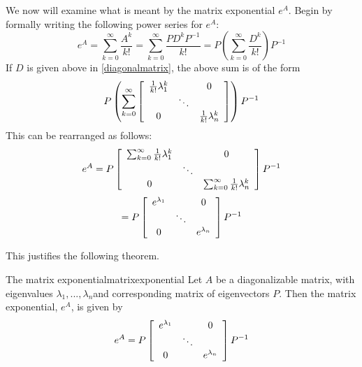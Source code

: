We now will examine what is meant by the matrix exponential $e^{A}$. Begin by formally writing the following power series for $e^{A}$:
\begin{equation*}
e^{A} =  \sum_{k=0}^{\infty }\frac{A^{k}}{k!}=\sum_{k=0}^{\infty }\frac{PD^{k}P^{-1}}{k!}=P \left( \sum_{k=0}^{\infty }\frac{D^{k}}{k!} \right)P^{-1}
\end{equation*}
If $D$ is given above in \ref{diagonalmatrix}, the above sum is of the form 
\begin{equation*}
P \left( \sum_{k=0}^{\infty }\left[ 
\begin{array}{ccc}
\frac{1}{k!}\lambda _{1}^{k} &  & 0 \\ 
& \ddots &  \\ 
0 &  & \frac{1}{k!}\lambda _{n}^{k}
\end{array}
\right] \right) P^{-1}
\end{equation*}
This can be rearranged as follows:
\begin{equation*}
e^{A}=P\left[ 
\begin{array}{ccc}
\sum_{k=0}^{\infty }\frac{1}{k!}\lambda _{1}^{k} &  & 0 \\ 
& \ddots &  \\ 
0 &  & \sum_{k=0}^{\infty }\frac{1}{k!}\lambda _{n}^{k}
\end{array}
\right] P^{-1}
\end{equation*}
\begin{equation*}
=P\left[ 
\begin{array}{ccc}
e^{\lambda _{1}} &  & 0 \\ 
& \ddots &  \\ 
0 &  & e^{\lambda _{n}}
\end{array}
\right] P^{-1}
\end{equation*}

This justifies the following theorem. 

\begin{theorem}{The matrix exponential}{matrixexponential}
Let $A$ be a diagonalizable matrix, with eigenvalues $\lambda_1, ..., \lambda_n$and corresponding matrix of eigenvectors $P$. Then the matrix exponential, $e^{A}$, is given by
\begin{equation*}
e^{A} = 
P\left[ 
\begin{array}{ccc}
e^{\lambda _{1}} &  & 0 \\ 
& \ddots &  \\ 
0 &  & e^{\lambda _{n}}
\end{array}
\right] P^{-1}
\end{equation*}
\end{theorem}

